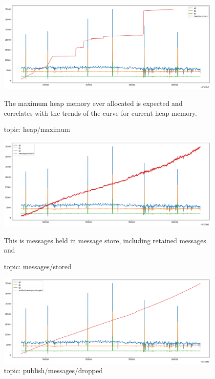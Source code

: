 \documentclass[12pt, letterpaper]{article}
\begin{document}
\begin{figure}
	\setlength{\tabcolsep}{0pt}
	\caption{topic: heap/maximum}
	\label{f:valid_cnt_heap_maximum}
	\begin{center}
		\includegraphics[width=\textwidth]{valid_cnt/valid_cnt-heap_maximum}
	\end{center}
	The maximum heap memory ever allocated is expected and correlates with the trends of the curve for current heap memory.
\end{figure}

\begin{figure}
	\setlength{\tabcolsep}{0pt}
	\caption{topic: messages/stored}
	\label{f:valid_cnt_messages_stored}
	\begin{center}
		\includegraphics[width=\textwidth]{valid_cnt/valid_cnt-messages_stored}	
	\end{center}
	This is messages held in message store, including retained messages and 
\end{figure}
\begin{figure}
	\setlength{\tabcolsep}{0pt}
	\caption{topic: publish/messages/dropped}
	\label{f:valid_cnt_publish_messages_dropped}
	\begin{center}
		\includegraphics[width=\textwidth]{valid_cnt/valid_cnt-publish_messages_dropped}	
	\end{center}
\end{figure}
\end{document}

